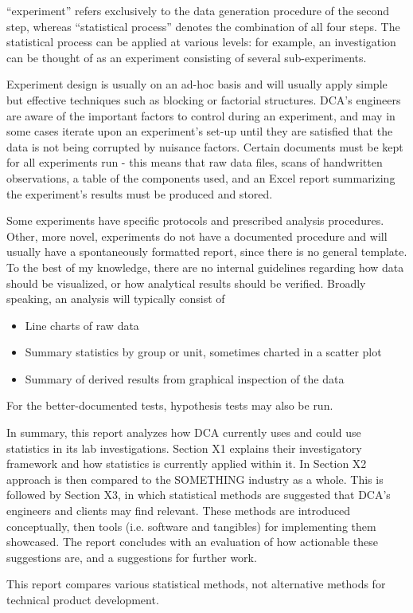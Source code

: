 \documentclass[11pt,a4paper,article]{memoir} %
\begin{document}
``experiment'' refers exclusively to the data generation procedure of the second step, whereas ``statistical process'' denotes the combination of all four steps.
The statistical process can be applied at various levels: for example, an investigation can be thought of as an experiment consisting of several sub-experiments.
\par
Experiment design is usually on an ad-hoc basis and will usually apply simple but effective techniques such as blocking or factorial structures. DCA's engineers are aware of the important factors to control during an experiment, and may in some cases iterate upon an experiment's set-up until they are satisfied that the data is not being corrupted by nuisance factors.
Certain documents must be kept for all experiments run - this means that raw data files, scans of handwritten observations, a table of the components used, and an Excel report summarizing the experiment's results must be produced and stored.
\par
 Some experiments have specific protocols and prescribed analysis procedures. Other, more novel, experiments do not have a documented procedure and will usually have a spontaneously formatted report, since there is no general template.  To the best of my knowledge, there are no internal guidelines regarding how data should be visualized, or how analytical results should be verified. Broadly speaking, an analysis will typically consist of
 \begin{itemize}
 	\item Line charts of raw data
 	\item Summary statistics by group or unit, sometimes charted in a scatter plot
 	\item Summary of derived results from graphical inspection of the data
 \end{itemize}
 For the better-documented tests, hypothesis tests may also be run.
\par
In summary, this report analyzes how DCA currently uses and could use statistics in its lab investigations. Section X1 explains their investigatory framework and how statistics is currently applied within it. In Section X2 approach is then compared to the SOMETHING industry as a whole. This is followed by Section X3, in which statistical methods are suggested that DCA's engineers and clients may find relevant. These methods are introduced conceptually, then tools (i.e. software and tangibles) for implementing them showcased. The report concludes with an evaluation of how actionable these suggestions are, and a suggestions for further work.
\par
This report compares various statistical methods, not alternative methods for technical product development.
\end{document}
